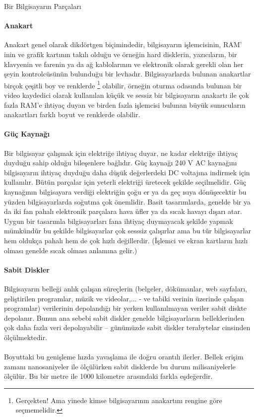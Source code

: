 \documentclass[10pt,a5paper]{book}
\begin{document}
\begin{section}{Bir Bilgisayarın Parçaları}
\paragraph{Anakart}{Anakart genel olarak dikdörtgen biçimindedir, bilgisayarın işlemcisinin, RAM' inin ve grafik kartının takılı olduğu ve örneğin hard disklerin, yazıcıların, bir klavyenin ve farenin ya da ağ kablolarının ve elektronik olarak gerekli olan her şeyin kontrolcüsünün bulunduğu bir levhadır. Bilgisayarlarda bulunan anakartlar birçok çeşitli boy ve renklerde 
\footnote{Gerçekten! Ama yinede kimse bilgisayarının anakartını rengine göre seçmemelidir.}
olabilir, örneğin oturma odasında bulunan bir video kaydedici olarak kullanılan küçük ve sessiz bir bilgisayarın anakartı ile çok fazla RAM'e ihtiyaç duyan ve birden fazla işlemcisi bulunan büyük sunucuların anakartları farklı boyut ve renklerde olabilir.}
\paragraph{Güç Kaynağı}{Bir bilgisayar çalışmak için elektriğe ihtiyaç duyar, ne kadar elektriğe ihtiyaç duyduğu sahip olduğu bileşenlere bağlıdır. Güç kaynağı 240 V AC kaynağını bilgisayarın ihtiyaç duyduğu daha düşük değerlerdeki DC voltajına indirmek için kullanılır. Bütün parçalar için yeterli elektriği üretecek şekilde seçilmelidir. Güç kaynağının bilgisayara verdiği elektriğin çoğu er ya da geç ısıya dönüşecektir bu yüzden bilgisayarlarda soğutma çok önemlidir. Basit tasarımlarda, genelde bir ya da iki fan pahalı elektronik parçalara hava üfler ya da sıcak havayı dışarı atar. Uygun bir tasarımla bilgisayarları fana ihtiyaç duymayacak şekilde yapmak mümkündür bu şekilde bilgisayarlar çok sesssiz çalışırlar ama bu tür bilgisayarlar hem oldukça pahalı hem de çok hızlı değillerdir. (İşlemci ve ekran kartların hızlı olması genelde sıcak olması anlamına gelir.)}
\paragraph{Sabit Diskler}{Bilgisayarın belleği anlık çalışan süreçlerin (belgeler, dökümanlar, web sayfaları, geliştirilen programlar, müzik ve videolar,... - ve tabiki verinin üzerinde çalışan programlar) verilerinin depolandığı bir yerken kullanılmayan veriler sabit diskte depolanır. Bunun ana sebebi sabit diskler genelde bilgisayarların belleklerinden çok daha fazla veri depolayabilir – günümüzde sabit diskler terabytelar cinsinden ölçülmektedir.}
\paragraph{}{Boyuttaki bu genişleme hızda yavaşlama ile doğru orantılı ilerler. Bellek erişim zamanı nanosaniyeler ile ölçülürken sabit disklerde bu durum milisaniyelerle ölçülür. Bu bir metre ile 1000 kilometre arasındaki farkla eşdeğerdir.}

\end{section}
\end{document}
